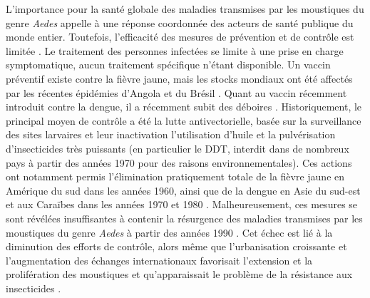 L'importance pour la santé globale des maladies transmises par les moustiques du genre {\em Aedes} appelle à une réponse coordonnée des acteurs de santé publique du monde entier.
Toutefois, l'efficacité des mesures de prévention et de contrôle est limitée \cite{lindsay2017improving}.
Le traitement des personnes infectées se limite à une prise en charge symptomatique, aucun traitement spécifique n'étant disponible.
Un vaccin préventif existe contre la fièvre jaune, mais les stocks mondiaux ont été affectés par les récentes épidémies d'Angola et du Brésil \cite{barrett2016yellow}.
Quant au vaccin récemment introduit contre la dengue, il a récemment subit des déboires \cite{denguevacc}.
Historiquement, le principal moyen de contrôle a été la lutte antivectorielle, basée sur la surveillance des sites larvaires et leur inactivation l'utilisation d'huile et la pulvérisation d'insecticides très puissants (en particulier le DDT, interdit dans de nombreux pays à partir des années 1970 pour des raisons environnementales).
Ces actions ont notamment permis l'élimination pratiquement totale de la fièvre jaune en Amérique du sud dans les années 1960, ainsi que de la dengue en Asie du sud-est et aux Caraïbes dans les années 1970 et 1980 \cite{camargo1967history}.
Malheureusement, ces mesures se sont révélées insuffisantes à contenir la résurgence des maladies transmises par les moustiques du genre {\em Aedes} à partir des années 1990 \cite{gubler2012dengue}.
Cet échec est lié à la diminution des efforts de contrôle, alors même que l'urbanisation croissante et l'augmentation des échanges internationaux favorisait l'extension et la prolifération des moustiques et qu'apparaissait le problème de la résistance aux insecticides \cite{vontas2012insecticide}.

